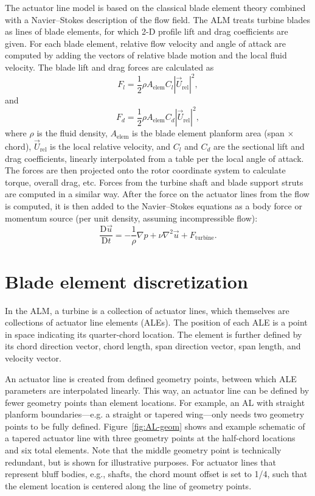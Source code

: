 The actuator line model is based on the classical blade element theory combined
with a Navier--Stokes description of the flow field. The ALM treats turbine
blades as lines of blade elements, for which 2-D profile lift and drag
coefficients are given. For each blade element, relative flow velocity and angle
of attack are computed by adding the vectors of relative blade motion and the
local fluid velocity. The blade lift and drag forces are calculated as
\begin{equation}
    F_l = \frac{1}{2} \rho A_\mathrm{elem} C_l |\vec{U}_\mathrm{rel}|^2,
\end{equation}
and
\begin{equation}
    F_d = \frac{1}{2} \rho A_\mathrm{elem} C_d |\vec{U}_\mathrm{rel}|^2,
\end{equation}
where $\rho$ is the fluid density, $A_\mathrm{elem}$ is the blade element
planform area (span $\times$ chord), $\vec{U}_\mathrm{rel}$ is the local
relative velocity, and $C_l$ and $C_d$ are the sectional lift and drag
coefficients, linearly interpolated from a table per the local angle of attack.
The forces are then projected onto the rotor coordinate system to calculate
torque, overall drag, etc. Forces from the turbine shaft and blade support
struts are computed in a similar way. After the force on the actuator lines from
the flow is computed, it is then added to the Navier--Stokes equations as a body
force or momentum source (per unit density, assuming incompressible flow):
\begin{equation}
    \frac{\mathrm{D} \vec{u}}{\mathrm{D} t} = - \frac{1}{\rho} \nabla p + \nu
    \nabla^2 \vec{u} + F_\mathrm{turbine}.
\end{equation}


\section{Blade element discretization}

In the ALM, a turbine is a collection of actuator lines, which themselves are
collections of actuator line elements (ALEs). The position of each ALE is a
point in space indicating its quarter-chord location. The element is further
defined by its chord direction vector, chord length, span direction vector, span
length, and velocity vector.

An actuator line is created from defined geometry points, between which ALE
parameters are interpolated linearly. This way, an actuator line can be defined
by fewer geometry points than element locations. For example, an AL with
straight planform boundaries---e.g. a straight or tapered wing---only needs two
geometry points to be fully defined. Figure~\ref{fig:AL-geom} shows and example
schematic of a tapered actuator line with three geometry points at the
half-chord locations and six total elements. Note that the middle geometry point
is technically redundant, but is shown for illustrative purposes. For actuator
lines that represent bluff bodies, e.g., shafts, the chord mount offset is set
to 1/4, such that the element location is centered along the line of geometry
points.

